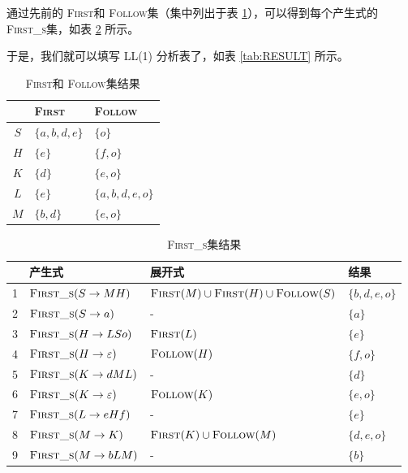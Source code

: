\documentclass[UTF8]{ctexart}
\newcommand\Emph[1]{\colorbox{green!10}{\textcolor{green!30!black}{#1}}}
\newcommand\FIRST{\textsc{First}}
\newcommand\FOLLOW{\textsc{Follow}}
\newcommand\FIRSTS{\textsc{First\_s}}
\begin{document}
通过先前的 \FIRST 和 \FOLLOW 集（集中列出于表 \ref{tab: FIRST_AND_FOLLOW}），可以得到每个产生式的 \FIRSTS 集，如表 \ref{tab:FIRSTS} 所示。

于是，我们就可以填写 \Emph{LL(1) 分析表}了，如表 \ref{tab:RESULT} 所示。

\begin{table}[p]
    \centering
    \begin{tabular}{cp{}p{}}
    \toprule
        & \FIRST & \FOLLOW \\
    \midrule
    $S$ & $\{a,b,d,e\}$ & $\{o\}$\\
    $H$ & $\{e\}$ & $\{f,o\}$\\
    $K$ & $\{d\}$& $\{e,o\}$\\
    $L$ & $\{e\}$& $\{a,b,d,e,o\}$\\
    $M$ & $\{b,d\}$& $\{e,o\}$\\
    \bottomrule
    \end{tabular}
    \caption{\FIRST 和 \FOLLOW 集结果}\label{tab: FIRST_AND_FOLLOW}
\end{table}

\begin{table}[p]
    \centering
    \begin{tabular}{clll}
    \toprule
        & 产生式 & 展开式 & 结果 \\
    \midrule
    1 & $\FIRSTS(S\to MH)$ & $\FIRST(M)\cup\FIRST(H)\cup\FOLLOW(S)$ & $\{b,d,e,o\}$ \\
    2 & $\FIRSTS(S\to a)$ & - & $\{a\}$ \\
    3 & $\FIRSTS(H\to LSo)$ & $\FIRST(L)$ & $\{e\}$ \\
    4 & $\FIRSTS(H\to\varepsilon)$ & $\FOLLOW(H) $ & $ \{f,o\}$ \\
    5 & $\FIRSTS(K\to dML)$ & - & $\{d\}$ \\
    6 & $\FIRSTS(K\to\varepsilon) $ & $ \FOLLOW(K)$ & $ \{e,o\}$ \\
    7 & $\FIRSTS(L\to eHf)$ & - & $\{e\}$ \\
    8 & $\FIRSTS(M\to K)$ & $\FIRST(K)\cup\FOLLOW(M)$ & $\{d,e,o\}$ \\
    9 & $\FIRSTS(M\to bLM)$ & - & $\{b\}$ \\
    \bottomrule
    \end{tabular}
    \caption{\FIRSTS 集结果}\label{tab:FIRSTS}
\end{table}
\end{document}

